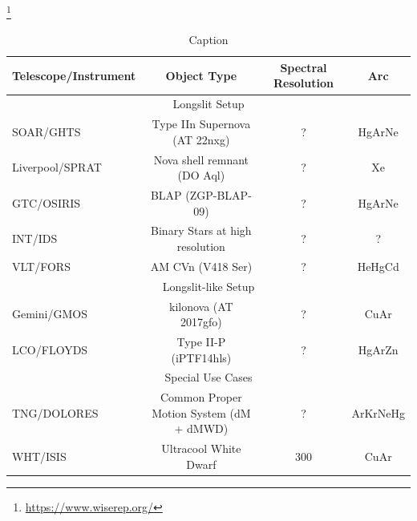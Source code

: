 \documentclass[twocolumn, linenumbers]{aastex631}
\begin{document}
\footnote{\url{https://www.wiserep.org/}}

\begin{table}
    \centering
    \begin{tabular}{l|c|c|c}\hline
        Telescope/Instrument & Object Type                                 & Spectral Resolution & Arc \\\hline\hline
        \multicolumn{4}{c}{Longslit Setup}\\\hline
        SOAR/GHTS            & Type IIn Supernova (AT 22nxg)               & ?                   & HgArNe \\
        Liverpool/SPRAT      & Nova shell remnant (DO Aql)                 & ?                   & Xe \\
        GTC/OSIRIS           & BLAP (ZGP-BLAP-09)                          & ?                   & HgArNe \\
        INT/IDS              & Binary Stars at high resolution             & ?                   & ? \\
        VLT/FORS             & AM CVn (V418 Ser)                           & ?                   & HeHgCd \\\hline
        \multicolumn{4}{c}{Longslit-like Setup}\\\hline
        Gemini/GMOS          & kilonova (AT 2017gfo)                       & ?                   & CuAr \\
        LCO/FLOYDS           & Type II-P (iPTF14hls)                       & ?                   & HgArZn \\\hline
        \multicolumn{4}{c}{Special Use Cases}\\\hline
        TNG/DOLORES          & Common Proper Motion System (dM + dMWD)     & ?                   & ArKrNeHg \\
        WHT/ISIS             & Ultracool White Dwarf                       & 300                 & CuAr \\\hline
\end{tabular}
    \caption{Caption}
    \label{tab:my_label}
\end{table}
\end{document}
